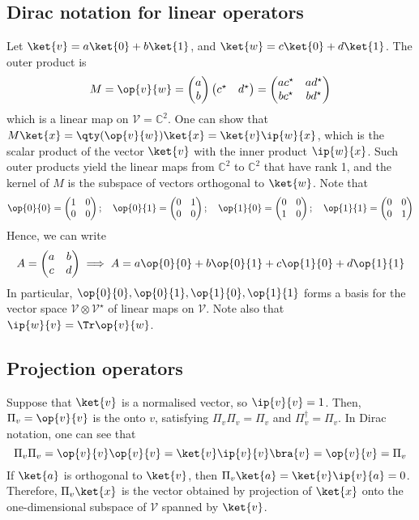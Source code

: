 \subsection{Dirac notation for linear operators}
Let $\ket{v} = a \ket{0} + b \ket{1}$, and $\ket{w} = c \ket{0} + d \ket{1}$.
The outer product is
\[ M = \op{v}{w} = \begin{pmatrix}
    a \\ b
\end{pmatrix} \begin{pmatrix}
    c^\star & d^\star
\end{pmatrix} = \begin{pmatrix}
    ac^\star & ad^\star \\
    bc^\star & bd^\star
\end{pmatrix} \]
which is a linear map on $\mathcal V = \mathbb C^2$.
One can show that $M \ket{x} = \qty(\op{v}{w})\ket{x} = \ket{v} \ip{w}{x}$, which is the scalar product of the vector $\ket{v}$ with the inner product $\ip{w}{x}$.
Such outer products yield the linear maps from $\mathbb C^2$ to $\mathbb C^2$ that have rank 1, and the kernel of $M$ is the subspace of vectors orthogonal to $\ket{w}$.
Note that
\[ \op{0}{0} = \begin{pmatrix}
    1 & 0 \\
    0 & 0
\end{pmatrix};\quad \op{0}{1} = \begin{pmatrix}
    0 & 1 \\
    0 & 0
\end{pmatrix};\quad \op{1}{0} = \begin{pmatrix}
    0 & 0 \\
    1 & 0
\end{pmatrix};\quad \op{1}{1} = \begin{pmatrix}
    0 & 0 \\
    0 & 1
\end{pmatrix} \]
Hence, we can write
\[ A = \begin{pmatrix}
    a & b \\
    c & d
\end{pmatrix} \implies A = a \op{0}{0} + b \op{0}{1} + c \op{1}{0} + d \op{1}{1} \]
In particular, $\op{0}{0}, \op{0}{1}, \op{1}{0}, \op{1}{1}$ forms a basis for the vector space $\mathcal V \otimes \mathcal V^\star$ of linear maps on $\mathcal V$.
Note also that $\ip{w}{v} = \Tr \op{v}{w}$.

\subsection{Projection operators}
Suppose that $\ket{v}$ is a normalised vector, so $\ip{v}{v} = 1$.
Then, $\Pi_v = \op{v}{v}$ is the  onto $v$, satisfying $\Pi_v \Pi_v = \Pi_v$ and $\Pi_v^\dagger = \Pi_v$.
In Dirac notation, one can see that
\[ \Pi_v \Pi_v = \op{v}{v} \op{v}{v} = \ket{v} \ip{v}{v} \bra{v} = \op{v}{v} = \Pi_v \]
If $\ket{a}$ is orthogonal to $\ket{v}$, then $\Pi_v \ket{a} = \ket{v} \ip{v}{a} = 0$.
Therefore, $\Pi_v \ket{x}$ is the vector obtained by projection of $\ket{x}$ onto the one-dimensional subspace of $\mathcal V$ spanned by $\ket{v}$.

